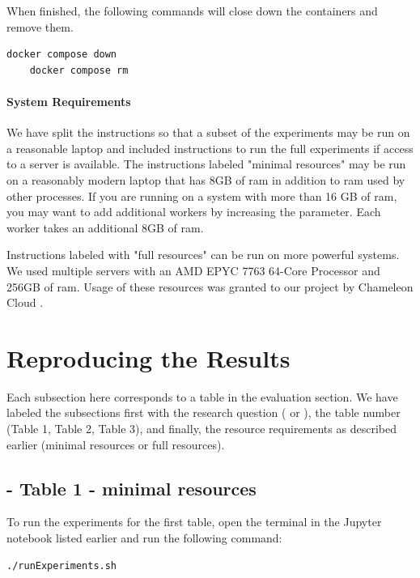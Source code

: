 \documentclass{acmart} %
\begin{document}
When finished, the following commands will close down the containers and remove them.

\begin{lstlisting}[language=bash]
    docker compose down
    docker compose rm
\end{lstlisting}

\paragraph{System Requirements} 
We have split the instructions so that a subset of the experiments may be run on a reasonable laptop and included instructions to run the full experiments if access to a server is available.
The instructions labeled "minimal resources" may be run on a reasonably modern laptop that has 8GB of ram in addition to ram used by other processes. If you are running on a system with more than 16 GB of ram, you may want to add additional workers by increasing the  parameter. Each worker takes an additional 8GB of ram.

Instructions labeled with "full resources" can be run on more powerful systems.  We used multiple servers with an AMD EPYC 7763 64-Core Processor and 256GB of ram.  Usage of these resources was granted to our project by Chameleon Cloud \cite{keahey2020lessons}.


\section{Reproducing the \toolname Results}

Each subsection here corresponds to a table in the evaluation section.  We have labeled the subsections first with the research question ( or ), the table number (Table 1, Table 2, Table 3), and finally, the resource requirements as described earlier (minimal resources or full resources).

\subsection{ - Table 1 - minimal resources}

To run the experiments for the first table, open the terminal in the Jupyter notebook listed earlier and run the following command:
\begin{lstlisting}[language=bash]
    ./runExperiments.sh
\end{lstlisting}
\end{document}
